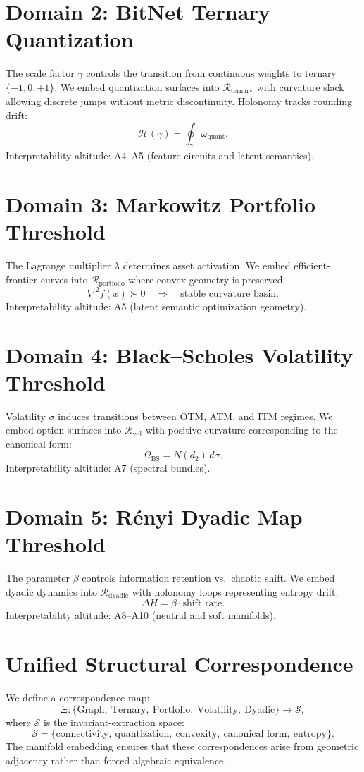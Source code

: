 \documentclass[11pt]{article}
\begin{document}
\section{Domain 2: BitNet Ternary Quantization}
The scale factor $\gamma$ controls the transition from continuous weights to
ternary $\{-1,0,+1\}$. We embed quantization surfaces into
$\mathcal{R}_{\mathrm{ternary}}$ with curvature slack allowing discrete jumps
without metric discontinuity. Holonomy tracks rounding drift:
\[
\mathcal{H}(\gamma) = \oint_\gamma \omega_{\mathrm{quant}}.
\]
Interpretability altitude: A4--A5 (feature circuits and latent semantics).

\section{Domain 3: Markowitz Portfolio Threshold}
The Lagrange multiplier $\lambda$ determines asset activation. We embed
efficient-frontier curves into $\mathcal{R}_{\mathrm{portfolio}}$ where convex
geometry is preserved:
\[
\nabla^2 f(x) \succ 0 \quad \Rightarrow \quad \text{stable curvature basin}.
\]
Interpretability altitude: A5 (latent semantic optimization geometry).

\section{Domain 4: Black--Scholes Volatility Threshold}
Volatility $\sigma$ induces transitions between OTM, ATM, and ITM regimes.
We embed option surfaces into $\mathcal{R}_{\mathrm{vol}}$ with positive
curvature corresponding to the canonical form:
\[
\Omega_{\mathrm{BS}} = N(d_2)\, d\sigma.
\]
Interpretability altitude: A7 (spectral bundles).

\section{Domain 5: Rényi Dyadic Map Threshold}
The parameter $\beta$ controls information retention vs.\ chaotic shift. We
embed dyadic dynamics into $\mathcal{R}_{\mathrm{dyadic}}$ with holonomy loops
representing entropy drift:
\[
\Delta H = \beta \cdot \text{shift rate}.
\]
Interpretability altitude: A8--A10 (neutral and soft manifolds).

\section{Unified Structural Correspondence}
We define a correspondence map:
\[
\Xi : \{\text{Graph},\ \text{Ternary},\ \text{Portfolio},\ 
\text{Volatility},\ \text{Dyadic}\}
\to \mathcal{S},
\]
where $\mathcal{S}$ is the invariant-extraction space:
\[
\mathcal{S} = \{\text{connectivity},\ \text{quantization},\ 
\text{convexity},\ \text{canonical form},\ \text{entropy}\}.
\]
The manifold embedding ensures that these correspondences arise from geometric
adjacency rather than forced algebraic equivalence.
\end{document}
